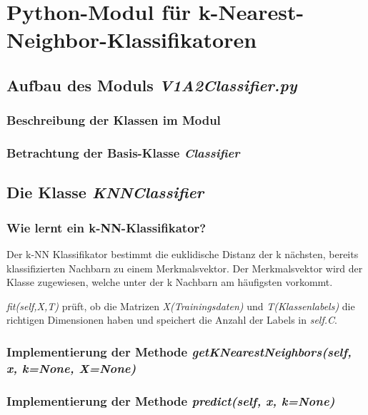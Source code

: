 \section{Python-Modul für k-Nearest-Neighbor-Klassifikatoren}


\subsection{Aufbau des Moduls \textit{V1A2\textunderscore Classifier.py}}


\subsubsection{Beschreibung der Klassen im Modul}


\subsubsection{Betrachtung der Basis-Klasse \textit{Classifier}}


\subsection{Die Klasse \textit{KNNClassifier}}

\subsubsection{Wie lernt ein k-NN-Klassifikator?}

Der k-NN Klassifikator bestimmt die euklidische Distanz der k nächsten, bereits klassifizierten Nachbarn zu einem Merkmalsvektor.  Der Merkmalsvektor wird der Klasse zugewiesen, welche unter der k Nachbarn am häufigsten vorkommt. 

\vspace{5px}
\noindent
\textit{fit(self,X,T)} prüft, ob die Matrizen \textit{X(Trainingsdaten)} und \textit{T(Klassenlabels)} die richtigen Dimensionen haben und speichert die Anzahl der Labels in \textit{self.C}.

\subsubsection{
    Implementierung der Methode \textit{getKNearestNeighbors(self, x, k=None, X=None)}
    }


\subsubsection{Implementierung der Methode \textit{predict(self, x, k=None)}}


